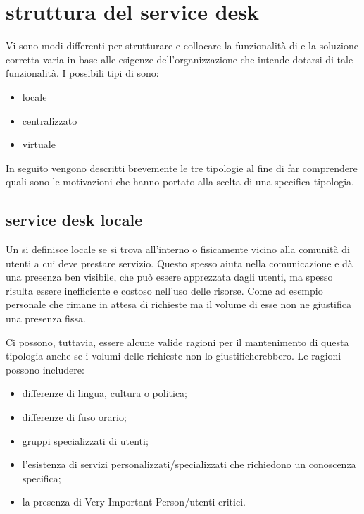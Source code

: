%
%
\section[Struttura del Service Desk]{struttura del service desk}
\label{sd-structure}
Vi sono modi differenti per strutturare e collocare la funzionalità di  e la soluzione corretta varia in base alle esigenze dell'organizzazione che intende dotarsi di tale funzionalità. I possibili tipi di  sono:

\begin{itemize}
\item{locale}
\item{centralizzato}
\item{virtuale}
\end{itemize}

In seguito vengono descritti brevemente le tre tipologie al fine di far comprendere quali sono le motivazioni che hanno portato alla scelta di una specifica tipologia.

\subsection[Service Desk Locale]{service desk locale}
\label{sd-local-sd}
Un  si definisce locale se si trova all'interno o fisicamente vicino alla comunità di utenti a cui deve prestare servizio. Questo spesso aiuta nella comunicazione e dà una presenza ben visibile, che può essere apprezzata dagli utenti, ma spesso risulta essere inefficiente e costoso nell'uso delle risorse. Come ad esempio personale che rimane in attesa di richieste ma il volume di esse non ne giustifica una presenza fissa.

Ci possono, tuttavia, essere alcune valide ragioni per il mantenimento di questa tipologia anche se i volumi delle richieste non lo giustificherebbero. Le ragioni possono includere:

\begin{itemize}
\item{differenze di lingua, cultura o politica;}
\item{differenze di fuso orario;}
\item{gruppi specializzati di utenti;}
\item{l'esistenza di servizi personalizzati/specializzati che richiedono un conoscenza specifica;}
\item{la presenza di \acs{Very-Important-Person}/utenti critici.}
\end{itemize}

